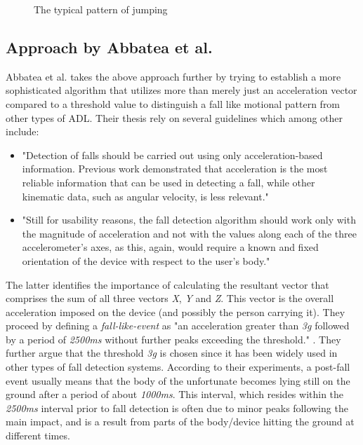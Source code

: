 \documentclass[12pt, a4paper, onecolumn]{article}
\begin{document}
	\begin{figure}[H]
		\centering
		\caption{The typical pattern of jumping}%
		\label{fig:Pattern-Jumping}%
	\end{figure}
	
	
	\subsection{Approach by Abbatea et al.}
	Abbatea et al. takes the above approach further by trying to establish a more sophisticated algorithm that utilizes more than merely just an acceleration vector compared to a threshold value to distinguish a fall like motional pattern from other types of ADL. Their thesis rely on several guidelines which among other include: 
	\begin{itemize} 
		\item "Detection of falls should be carried out using only acceleration-based information. Previous work demonstrated that acceleration is the most reliable information that can be used in detecting a fall, while other kinematic data, such as angular velocity, is less relevant." \cite[p~3]{piza_uni}
		
		\item "Still for usability reasons, the fall detection algorithm should work only with the magnitude of acceleration and not with the values along each of the three accelerometer’s axes, as this, again, would require a known and fixed orientation of the device with respect to the user’s body." \cite[p~3]{piza_uni}
	\end{itemize}
	
	The latter identifies the importance of calculating the resultant vector that comprises the sum of all three vectors \textit{X}, \textit{Y} and \textit{Z}. This vector is the overall acceleration imposed on the device (and possibly the person carrying it). They proceed by defining a \textit{fall-like-event} as "an acceleration greater than \textit{3g} followed by a period of \textit{2500ms} without further peaks exceeding the threshold." \cite[p~5]{piza_uni}. They further argue that the threshold \textit{3g} is chosen since it has been widely used in other types of fall detection systems. According to their experiments, a post-fall event usually means that the body of the unfortunate becomes lying still on the ground after a period of about \textit{1000ms}. This interval, which resides within the \textit{2500ms} interval prior to fall detection is often due to minor peaks following the main impact, and is a result from parts of the body/device hitting the ground at different times. 
	
\end{document}
